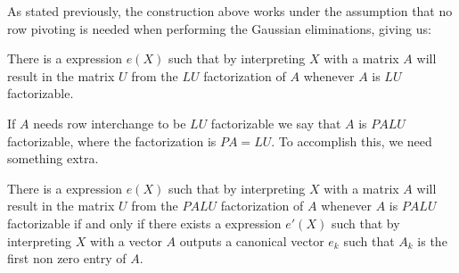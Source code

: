 As stated previously, the construction above works under the assumption that no row pivoting is needed when performing the Gaussian eliminations, giving us:
\begin{proposition}\label{prop:gauss}
There is a \langfor expression $e(X)$ such that by interpreting $X$ with a matrix $A$ will result in the matrix $U$ from the $LU$ factorization of $A$ whenever $A$ is $LU$ factorizable.
\end{proposition}

If $A$ needs row interchange to be $LU$ factorizable we say that $A$ is $PALU$ factorizable, where the factorization is $PA=LU$. To accomplish this, we need something extra.
 \begin{proposition}\label{prop:palu}
There is a \langfor expression $e(X)$ such that by interpreting $X$ with a matrix $A$ will result in the matrix $U$ from the $PALU$ factorization of $A$ whenever $A$ is $PALU$ factorizable if and only if there exists a \langfor expression $e'(X)$ such that by interpreting $X$ with a vector $A$ outputs a canonical vector $e_k$ such that $A_k$ is the first non zero entry of $A$.
\end{proposition}

